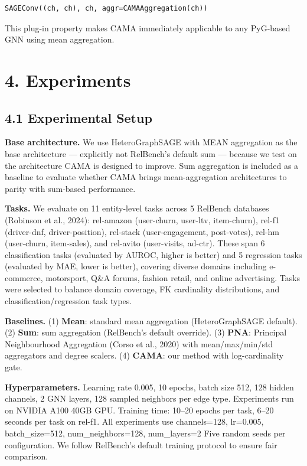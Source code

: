 \documentclass[final]{article}
\begin{document}
\begin{verbatim}
SAGEConv((ch, ch), ch, aggr=CAMAAggregation(ch))
\end{verbatim}

This plug-in property makes CAMA immediately applicable to any PyG-based GNN using mean aggregation.


\section{4. Experiments}

\subsection{4.1 Experimental Setup}

\textbf{Base architecture.} We use HeteroGraphSAGE with MEAN aggregation as the base architecture --- explicitly not RelBench's default sum --- because we test on the architecture CAMA is designed to improve. Sum aggregation is included as a baseline to evaluate whether CAMA brings mean-aggregation architectures to parity with sum-based performance.

\textbf{Tasks.} We evaluate on 11 entity-level tasks across 5 RelBench databases (Robinson et al., 2024): rel-amazon (user-churn, user-ltv, item-churn), rel-f1 (driver-dnf, driver-position), rel-stack (user-engagement, post-votes), rel-hm (user-churn, item-sales), and rel-avito (user-visits, ad-ctr). These span 6 classification tasks (evaluated by AUROC, higher is better) and 5 regression tasks (evaluated by MAE, lower is better), covering diverse domains including e-commerce, motorsport, Q\&A forums, fashion retail, and online advertising. Tasks were selected to balance domain coverage, FK cardinality distributions, and classification/regression task types.

\textbf{Baselines.} (1) \textbf{Mean}: standard mean aggregation (HeteroGraphSAGE default). (2) \textbf{Sum}: sum aggregation (RelBench's default override). (3) \textbf{PNA}: Principal Neighbourhood Aggregation (Corso et al., 2020) with mean/max/min/std aggregators and degree scalers. (4) \textbf{CAMA}: our method with log-cardinality gate.

\textbf{Hyperparameters.} Learning rate 0.005, 10 epochs, batch size 512, 128 hidden channels, 2 GNN layers, 128 sampled neighbors per edge type. Experiments run on NVIDIA A100 40GB GPU. Training time: 10--20 epochs per task, 6--20 seconds per task on rel-f1. All experiments use channels=128, lr=0.005, batch\_size=512, num\_neighbors=128, num\_layers=2 Five random seeds per configuration. We follow RelBench's default training protocol to ensure fair comparison.
\end{document}
